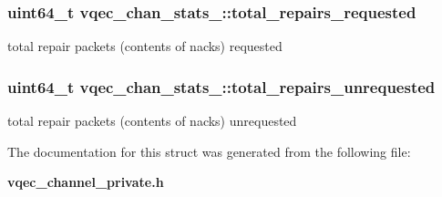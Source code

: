 \subsubsection{\setlength{\rightskip}{0pt plus 5cm}uint64\_\-t \bf{vqec\_\-chan\_\-stats\_\-::total\_\-repairs\_\-requested}}\label{structvqec__chan__stats___2030a501239b31a6dd4626fc1f09ed29}


total repair packets (contents of nacks) requested 
\subsubsection{\setlength{\rightskip}{0pt plus 5cm}uint64\_\-t \bf{vqec\_\-chan\_\-stats\_\-::total\_\-repairs\_\-unrequested}}\label{structvqec__chan__stats___020ff701940fb6f30cf0afbd7f833d18}


total repair packets (contents of nacks) unrequested 

The documentation for this struct was generated from the following file:\begin{CompactItemize}
\item 
\bf{vqec\_\-channel\_\-private.h}\end{CompactItemize}
